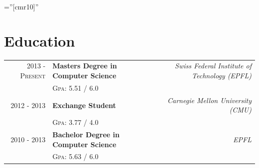 \documentclass[a4paper,11pt]{article} %
\begin{document}
\pagestyle{empty} %

\font\fb=''[cmr10]'' %



\par{
\bigskip
\par
} %


\section{Education}

\begin{tabularx}{\textwidth}{r X r} 	
2013 - \textsc{Present} & 
\textbf{Masters Degree in Computer Science} & 
\textit{Swiss Federal Institute of Technology (EPFL)}\\
&\footnotesize \textsc{Gpa}: 5.51 / 6.0\\


2012 - 2013 & 
\textbf{Exchange Student} &
\textit{Carnegie Mellon University (CMU)}\\
&\footnotesize \textsc{Gpa}: 3.77 / 4.0\\


2010 - 2013 & 
\textbf{Bachelor Degree in Computer Science} & 
\textit{ EPFL }\\
&\footnotesize \textsc{Gpa}: 5.63 / 6.0\\


\end{tabularx}
\end{document}
